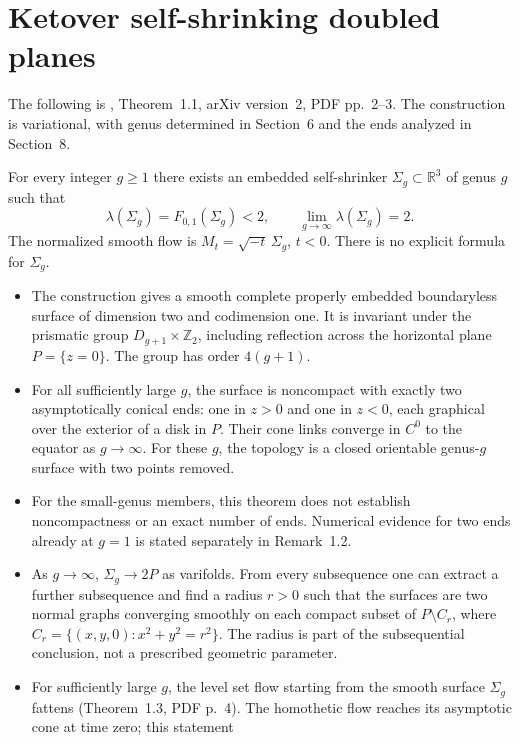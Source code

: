 \chapter{Ketover self-shrinking doubled planes}\label{sec:catalogue-ketover-doubled-plane}
The following is \cite{CatKetover2024}, Theorem~1.1, arXiv version~2,
PDF pp.~2--3. The construction is variational, with genus determined
in Section~6 and the ends analyzed in Section~8.

\begin{example}\label{ex:catalogue-ketover-doubled-plane}
For every integer $g\geq1$ there exists an embedded self-shrinker
$\Sigma_g\subset\mathbb R^3$ of genus $g$ such that
\[
 \lambda(\Sigma_g)=F_{0,1}(\Sigma_g)<2,
 \qquad \lim_{g\to\infty}\lambda(\Sigma_g)=2.
\]
The normalized smooth flow is $M_t=\sqrt{-t}\,\Sigma_g$, $t<0$.
There is no explicit formula for $\Sigma_g$.
\begin{itemize}
\item The construction gives a smooth complete properly embedded
boundaryless surface of dimension two and codimension one. It is
invariant under the prismatic group $D_{g+1}\times\mathbb Z_2$,
including reflection across the horizontal plane $P=\{z=0\}$.
The group has order $4(g+1)$.
\item For all sufficiently large $g$, the surface is noncompact with
exactly two asymptotically conical ends: one in $z>0$ and one in
$z<0$, each graphical over the exterior of a disk in $P$. Their cone
links converge in $C^0$ to the equator as $g\to\infty$.
For these $g$, the topology is a closed orientable genus-$g$ surface
with two points removed.
\item For the small-genus members, this theorem does not establish
noncompactness or an exact number of ends. Numerical evidence for
two ends already at $g=1$ is stated separately in Remark~1.2.
\item As $g\to\infty$, $\Sigma_g\to2P$ as varifolds. From every
subsequence one can extract a further subsequence and find a radius
$r>0$ such that the surfaces are two normal graphs converging smoothly
on each compact subset of $P\setminus C_r$, where
$C_r=\{(x,y,0):x^2+y^2=r^2\}$. The radius is part of the subsequential
conclusion, not a prescribed geometric parameter.
\item For sufficiently large $g$, the level set flow starting from the
smooth surface $\Sigma_g$ fattens (Theorem~1.3, PDF p.~4). The
homothetic flow reaches its asymptotic cone at time zero; this statement

\end{itemize}
\end{example}
